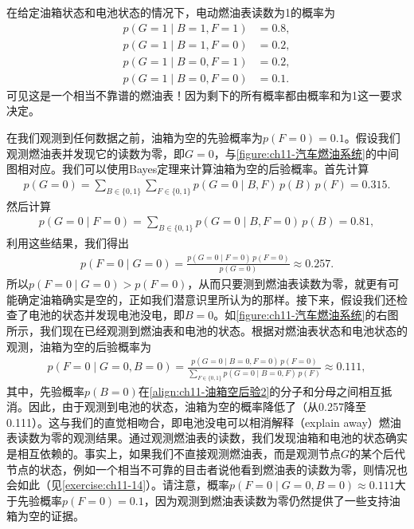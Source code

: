 \documentclass[../../main.tex]{subfiles}
\begin{document}
\begin{example}[ 汽车燃油系统]\label{example:ch11-汽车燃油系统}
在给定油箱状态和电池状态的情况下，电动燃油表读数为1的概率为
\begin{align}
  p(G=1\mid B=1,F=1) &= 0.8,\\
  p(G=1\mid B=1,F=0) &= 0.2,\\
  p(G=1\mid B=0,F=1) &= 0.2,\\
  p(G=1\mid B=0,F=0) &= 0.1.
\end{align}
可见这是一个相当不靠谱的燃油表！因为剩下的所有概率都由概率和为1这一要求决定。

在我们观测到任何数据之前，油箱为空的先验概率为$p(F=0)=0.1$。假设我们观测燃油表并发现它的读数为零，即$G=0$，与\cref{figure:ch11-汽车燃油系统}的中间图相对应。我们可以使用Bayes定理来计算油箱为空的后验概率。首先计算
\begin{align}
  p(G=0) = \sum_{B\in\{0,1\}}\sum_{F\in\{0,1\}}p(G=0\mid B,F)\,p(B)\,p(F) = 0.315.
  \label{align:ch11-燃油表边缘}
\end{align}
然后计算
\begin{align}
  p(G=0\mid F=0) = \sum_{B\in\{0,1\}}p(G=0\mid B,F=0)\,p(B) = 0.81,
  \label{align:ch11-燃油表条件}
\end{align}
利用这些结果，我们得出
\begin{align}
  p(F=0\mid G=0) = \frac{p(G=0\mid F=0)\,p(F=0)}{p(G=0)} \approx 0.257.
  \label{align:ch11-油箱空后验1}
\end{align}
所以$p(F=0\mid G=0)>p(F=0)$，从而只要测到燃油表读数为零，就更有可能确定油箱确实是空的，正如我们潜意识里所认为的那样。接下来，假设我们还检查了电池的状态并发现电池没电，即$B=0$。如\cref{figure:ch11-汽车燃油系统}的右图所示，我们现在已经观测到燃油表和电池的状态。根据对燃油表状态和电池状态的观测，油箱为空的后验概率为
\begin{align}
  p(F=0\mid G=0,B=0) = \frac{p(G=0\mid B=0,F=0)\,p(F=0)}{\sum_{F\in\{0,1\}}p(G=0\mid B=0,F)\,p(F)} \approx 0.111,
  \label{align:ch11-油箱空后验2}
\end{align}
其中，先验概率$p(B=0)$在\eqref{align:ch11-油箱空后验2}的分子和分母之间相互抵消。因此，由于观测到电池的状态，油箱为空的概率降低了（从0.257降至0.111）。这与我们的直觉相吻合，即电池没电可以相消解释（explain away）燃油表读数为零的观测结果。通过观测燃油表的读数，我们发现油箱和电池的状态确实是相互依赖的。事实上，如果我们不直接观测燃油表，而是观测节点$G$的某个后代节点的状态，例如一个相当不可靠的目击者说他看到燃油表的读数为零，则情况也会如此（见\cref{exercise:ch11-14}）。请注意，概率$p(F=0\mid G=0,B=0)\approx 0.111$大于先验概率$p(F=0)=0.1$，因为观测到燃油表读数为零仍然提供了一些支持油箱为空的证据。
\end{example}
\end{document}
